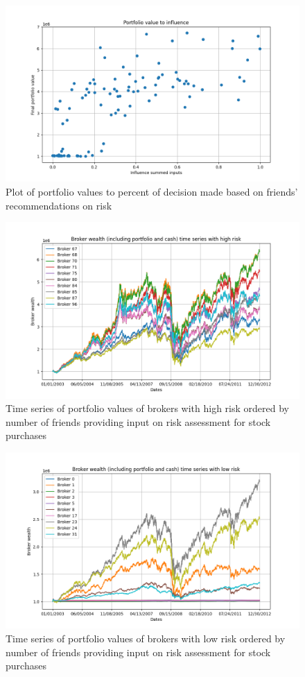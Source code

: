 \documentclass[letterpaper, 11 pt, proceedings]{IEEEtran}
\begin{document}
	\begin{figure}[h]
		\centering
		\includegraphics[width=.4\textwidth]{valueToInfluence_influence04.png}
		\caption{Plot of portfolio values to percent of decision made based on friends' recommendations on risk}
		\label{fig:value_to_influence_influencerun}
	\end{figure}	
	\FloatBarrier
	
	\begin{figure}[h]
		\centering
		\includegraphics[width=.4\textwidth]{timeSeriesJoint_influenceRun04_HighRisk.png}
		\caption{Time series of portfolio values of brokers with high risk ordered by number of friends providing input on risk assessment for stock purchases}
		\label{fig:high_risk_influence_time_series}
	\end{figure}	
	\FloatBarrier

	\begin{figure}[h]
		\centering
		\includegraphics[width=.4\textwidth]{timeSeriesJoint_influenceRun04_LowRisk.png}
		\caption{Time series of portfolio values of brokers with low risk ordered by number of friends providing input on risk assessment for stock purchases}
		\label{fig:low_risk_influence_time_series}
	\end{figure}	
	\FloatBarrier
\end{document}
